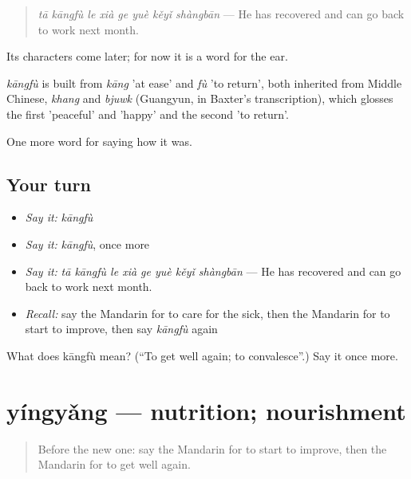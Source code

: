 \begin{quote}
\emph{tā kāngfù le xià ge yuè kěyǐ shàngbān} — He has recovered and can go back to work next month.
\end{quote}

Its characters come later; for now it is a word for the ear.

\begin{cousinweb}
\emph{kāngfù} is built from \emph{kāng} 'at ease' and \emph{fù} 'to return', both inherited from Middle Chinese, \emph{khang} and \emph{bjuwk} (Guangyun, in Baxter's transcription), which glosses the first 'peaceful' and 'happy' and the second 'to return'.
\end{cousinweb}

\begin{grammarlens}[title={What you've built}]
One more word for saying how it was.
\end{grammarlens}

\subsection*{Your turn}
\begin{itemize}
\raggedright
  \item \emph{Say it:} \emph{kāngfù}
  \item \emph{Say it:} \emph{kāngfù}, once more
  \item \emph{Say it:} \emph{tā kāngfù le xià ge yuè kěyǐ shàngbān} — He has recovered and can go back to work next month.
  \item \emph{Recall:} say the Mandarin for to care for the sick, then the Mandarin for to start to improve, then say \emph{kāngfù} again
\end{itemize}

\begin{tcolorbox}[breakable,colback=teal!4,colframe=teal!35!black,title={Before you move on}]
What does kāngfù mean? (\textquotedblleft{}To get well again; to convalesce\textquotedblright{}.) Say it once more.
\end{tcolorbox}
\section[yíngyǎng]{yíngyǎng — nutrition; nourishment}

\label{lesson:ZH-C483-yingyang}



\begin{quote}
Before the new one: say the Mandarin for to start to improve, then the Mandarin for to get well again.
\end{quote}

